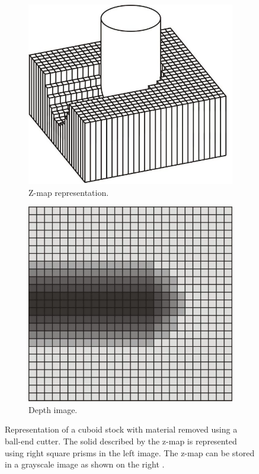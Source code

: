 \begin{description}
	\begin{figure}[H]
		\centering
		\begin{subfigure}[b]{0.4\textwidth}
			\centering
			\includegraphics[width=\textwidth]{images/zmap}
			\caption{Z-map representation.}
			\label{fig:zmap}
		\end{subfigure}
		\begin{subfigure}[b]{0.4\textwidth}
			\centering
			\includegraphics[width=\textwidth]{images/depth_image}
			\caption{Depth image.}
			\label{fig:depth_image}
		\end{subfigure}
		\caption{
			Representation of a cuboid stock with material removed using a ball-end cutter.
			The solid described by the z-map is represented using right square prisms in the left image.
			The z-map can be stored in a grayscale image as shown on the right  \cite{virtual_machining_review}.
		}
	\end{figure}



\end{description}
